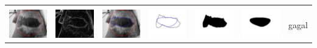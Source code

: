 \begin{table}[H]
\begin{tabular}{|m{0.7in}|m{0.7in}|m{0.7in}|m{0.7in}|m{0.7in}|m{0.7in}|m{0.7in}|}
		&  &  & & & &  \\
		\includegraphics[width=0.7in]{dataset/dataset_3/luka_merah/ready/14_interp_init.jpg}&
		\includegraphics[width=0.7in]{dataset/dataset_3/luka_merah/ready/14_interp_ext.jpg}&
		\includegraphics[width=0.7in]{dataset/dataset_3/luka_merah/ready/14_interp_result.jpg}&
		\includegraphics[width=0.7in]{dataset/dataset_3/luka_merah/ready/14_gt_r.jpg}&
		\includegraphics[width=0.7in]{dataset/dataset_3/luka_merah/ready/14_r.jpg}&
		\includegraphics[width=0.7in]{dataset/dataset_3/luka_merah/ready/14_interp_r.jpg}&
		gagal\\
		\hline
		

\end{tabular}
\end{table}
